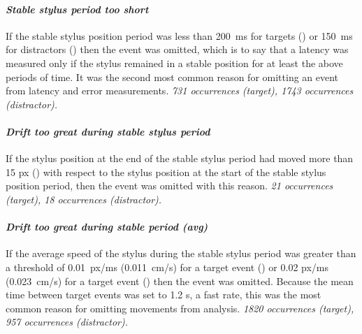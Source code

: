 \documentclass[11pt, a4paper]{article}
\begin{document}
\paragraph{\emph{Stable stylus period too short}}

If the stable stylus position period was less than 200~ms for targets
() or 150~ms for distractors
() then the event was
omitted, which is to say that a latency was measured only if the
stylus remained in a stable position for at least the above periods of
time. It was the second most common reason for omitting an event from
latency and error measurements. \emph{731 occurrences (target), 1743
  occurrences (distractor).}



\paragraph{\emph{Drift too great during stable stylus period}}
If the stylus position at the end of the stable stylus period had
moved more than 15 px () with respect
to the stylus position at the start of the stable stylus position
period, then the event was omitted with this reason.  \emph{21
  occurrences (target), 18 occurrences (distractor).}

\paragraph{\emph{Drift too great during stable period (avg)}} If
the average speed of the stylus during the stable stylus period was
greater than a threshold of 0.01~px/ms (0.011~cm/s) for a target event
() or 0.02 px/ms (0.023~cm/s) for
a target event () then the
event was omitted. Because the mean time between target events was set
to 1.2 s, a fast rate, this was the most common reason for omitting
movements from analysis. \emph{1820 occurrences (target), 957
  occurrences (distractor).}
\end{document}
